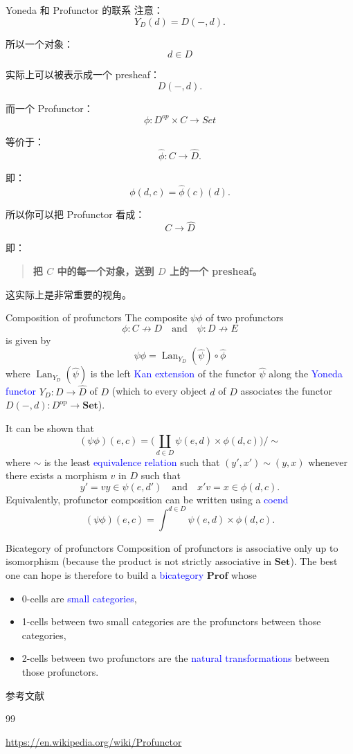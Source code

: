 \documentclass{beamer}
\begin{document}
\begin{frame}[shrink]{Yoneda 和 Profunctor 的联系}
注意：
$$
Y_D(d)=D(-,d).
$$

所以一个对象：
$$
d\in D
$$

实际上可以被表示成一个 presheaf：
$$
D(-,d).
$$

而一个 Profunctor：
$$
\phi:D^{op}\times C\to Set
$$

等价于：
$$
\widehat\phi:C\to\widehat D.
$$

即：
$$
\boxed{
\phi(d,c)
=
\widehat\phi(c)(d).
}
$$

所以你可以把 Profunctor 看成：
$$
\boxed{
C\longrightarrow \widehat D
}
$$

即：

\begin{quote}\textbf{把 \(C\) 中的每一个对象，送到 \(D\) 上的一个 presheaf。}\end{quote}

这实际上是非常重要的视角。
\end{frame}

\begin{frame}[shrink]{Composition of profunctors}
The composite $\psi\phi$ of two profunctors
\[
\phi \colon C \nrightarrow D \quad\text{and}\quad \psi \colon D \nrightarrow E
\]
is given by
\[
\psi\phi = \operatorname{Lan}_{Y_D}(\hat{\psi}) \circ \hat{\phi}
\]
where $\operatorname{Lan}_{Y_D}(\hat{\psi})$ is the left \textcolor{blue}{Kan extension} of the functor $\hat{\psi}$ along the \textcolor{blue}{Yoneda functor} $Y_D \colon D \to \hat{D}$ of $D$ (which to every object $d$ of $D$ associates the functor $D(-,d) \colon D^{\mathrm{op}} \to \mathbf{Set}$).

It can be shown that
\[
(\psi\phi)(e,c) = \Biggl( \coprod_{d\in D} \psi(e,d) \times \phi(d,c) \Biggr) \Big/ \sim
\]
where $\sim$ is the least \textcolor{blue}{equivalence relation} such that $(y',x') \sim (y,x)$ whenever there exists a morphism $v$ in $D$ such that
\[
y' = vy \in \psi(e,d') \quad\text{and}\quad x'v = x \in \phi(d,c).
\]
Equivalently, profunctor composition can be written using a \textcolor{blue}{coend}
\[
(\psi\phi)(e,c) = \int^{d\in D} \psi(e,d) \times \phi(d,c).
\]
\end{frame}

\begin{frame}{Bicategory of profunctors}
Composition of profunctors is associative only up to isomorphism (because the product is not strictly associative in $\mathbf{Set}$). The best one can hope is therefore to build a \textcolor{blue}{bicategory} $\mathbf{Prof}$ whose
\begin{itemize}
  \item 0-cells are \textcolor{blue}{small categories},
  \item 1-cells between two small categories are the profunctors between those categories,
  \item 2-cells between two profunctors are the \textcolor{blue}{natural transformations} between those profunctors.
\end{itemize}
\end{frame}

\begin{frame}[allowframebreaks]{参考文献}
\begin{thebibliography}{99}

\url{https://en.wikipedia.org/wiki/Profunctor}

\end{thebibliography}
\end{frame}
\end{document}
